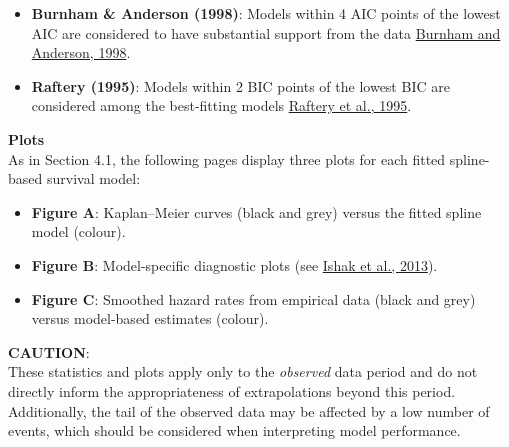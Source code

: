 \documentclass[
]{article}
\providecommand{\tightlist}{%
  \setlength{\itemsep}{0pt}\setlength{\parskip}{0pt}}
\begin{document}
\begin{itemize}
\tightlist
\item
  \textbf{Burnham \& Anderson (1998)}: Models within 4 AIC points of the
  lowest AIC are considered to have substantial support from the data
  \href{https://doi.org/10.1007/978-1-4757-2917-7}{Burnham and Anderson,
  1998}.\\
\item
  \textbf{Raftery (1995)}: Models within 2 BIC points of the lowest BIC
  are considered among the best-fitting models
  \href{https://doi.org/10.2307/271063}{Raftery et al., 1995}.
\end{itemize}

\textbf{Plots}\\
As in Section 4.1, the following pages display three plots for each
fitted spline-based survival model:

\begin{itemize}
\tightlist
\item
  \textbf{Figure A}: Kaplan--Meier curves (black and grey) versus the
  fitted spline model (colour).\\
\item
  \textbf{Figure B}: Model-specific diagnostic plots (see
  \href{https://doi.org/10.1007/s40273-013-0064-3}{Ishak et al.,
  2013}).\\
\item
  \textbf{Figure C}: Smoothed hazard rates from empirical data (black
  and grey) versus model-based estimates (colour).
\end{itemize}

\textbf{CAUTION}:\\
These statistics and plots apply only to the \emph{observed} data period
and do not directly inform the appropriateness of extrapolations beyond
this period.\\
Additionally, the tail of the observed data may be affected by a low
number of events, which should be considered when interpreting model
performance.

\clearpage
\end{document}
